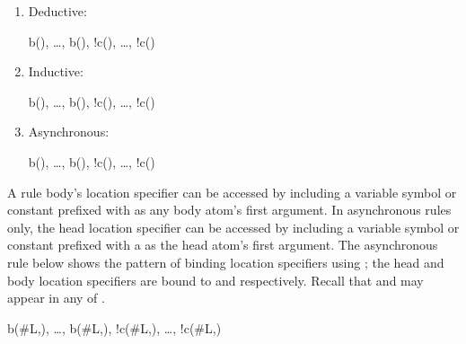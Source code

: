 \begin{enumerate}

\item Deductive:

\begin{Drules}
        {b(), \ldots, b(), !c(), \ldots, !c()}
\end{Drules}

\item Inductive:

\begin{Drules}
        {b(), \ldots, b(), !c(), \ldots, !c()}
\end{Drules}

\item Asynchronous:

\begin{Drules}
        {b(), \ldots, b(), !c(), \ldots, !c()}
\end{Drules}
\end{enumerate}

A rule body's location specifier can be accessed by including a variable symbol
or constant prefixed with \dedalus{#} as any body atom's first argument.  In
asynchronous rules only, the head location specifier can be accessed by
including a variable symbol or constant prefixed with a \dedalus{#} as the head
atom's first argument.  The asynchronous rule below shows the pattern of binding location specifiers using \dedalus{#}; the
head and body location specifiers are bound to  and  respectively.
Recall that  and  may appear in any of .

\begin{Drules}
        {b(#L,), \ldots, b(#L,), !c(#L,), \ldots, !c(#L,)}
\end{Drules}


